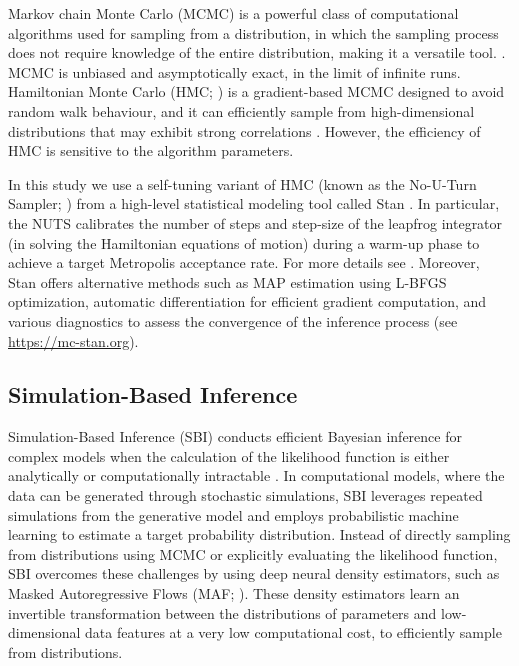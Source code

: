\documentclass[preprint,11pt,authoryear]{elsarticle}
\begin{document}
Markov chain Monte Carlo (MCMC) is a powerful class of computational algorithms used for sampling from a distribution, in which the sampling process does not require knowledge of the entire distribution, making it a versatile tool. \citep{Andrieu2003, Murphy2022, Mcelreath2020}. MCMC is unbiased and asymptotically exact, in the limit of infinite runs. Hamiltonian Monte Carlo (HMC; \cite{Duane1987, Neal2010}) is a gradient-based MCMC designed to avoid random walk behaviour, and it can efficiently sample from high-dimensional distributions that may exhibit strong correlations \citep{Betancourt2017}. However, the efficiency of HMC is sensitive to the algorithm parameters. 

In this study we use a self-tuning variant of HMC (known as the No-U-Turn Sampler; \cite{Hoffman2014}) from a high-level statistical modeling tool called Stan \citep{Carpenter2017}.
In particular, the NUTS calibrates the number of steps and step-size of the leapfrog integrator (in solving the Hamiltonian equations of motion) during a warm-up phase to achieve a target Metropolis acceptance rate. For more details see \cite{Betancourt2013, Baldy2023}. Moreover, Stan offers alternative methods such as MAP estimation using L-BFGS optimization, automatic differentiation for efficient gradient computation, and various diagnostics to assess the convergence of the inference process (see \url{https://mc-stan.org}). 



\subsection{Simulation-Based Inference}

Simulation-Based Inference (SBI) conducts efficient Bayesian inference for complex models when the calculation of the likelihood function is either analytically or computationally intractable \citep{Cranmer2020, Brehmer2021}.
In computational models, where the data can be generated through stochastic simulations, SBI leverages repeated simulations from the generative model and employs probabilistic machine learning to estimate a target probability distribution. Instead of directly sampling from distributions using MCMC or explicitly evaluating the likelihood function, SBI overcomes these challenges by using deep neural density estimators, such as Masked Autoregressive Flows (MAF; \citep{Papamakarios2017}).  These density estimators learn an invertible transformation between the distributions of parameters and low-dimensional data features at a very low computational cost, to efficiently sample from distributions. 
\end{document}
